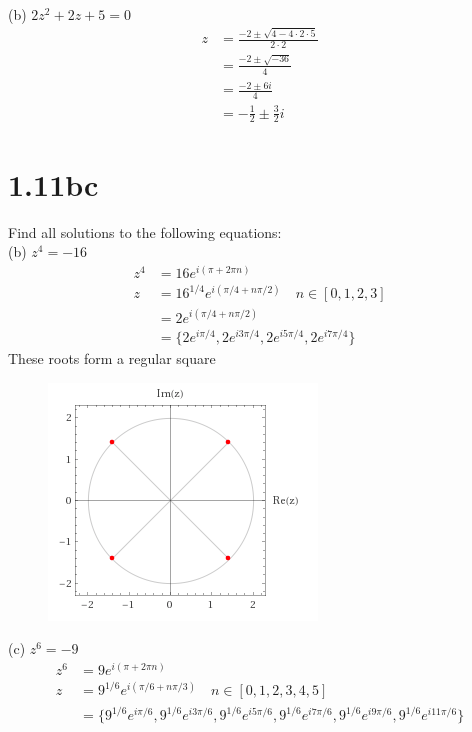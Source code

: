 \documentclass[a4paper, 11pt]{article}
\begin{document}
\noindent(b) $2z^2+2z+5=0$ 
	\begin{align*}
		z &= \frac{-2 \pm \sqrt{4-4\cdot2\cdot5}}{2\cdot2} \\ 
			&= \frac{-2 \pm \sqrt{-36}}{4} \\ 
			&=\frac{-2 \pm 6i}{4} \\ 
			&= -\frac{1}{2} \pm \frac{3}{2}i
	\end{align*}
	
\section*{1.11bc} 
Find all solutions to the following equations:\\

\noindent(b) $z^4 = -16$ \\ 
	\begin{align*}
		z^4 &= 16e^{i(\pi + 2\pi n)}\\ 
		z	&= 16^{1/4}e^{i(\pi/4+n\pi/2)} \quad n\in[0, 1, 2, 3] \\ 
			&= 2e^{i(\pi/4+n\pi/2)}\\
			&= \big\{ 2e^{i\pi/4}, 2e^{i3\pi/4}, 2e^{i5\pi/4}, 2e^{i7\pi/4} \big\}
	\end{align*}
\pagebreak
These roots form a regular square
	\begin{figure}[!hbt]
		\centering
		\includegraphics[scale=0.75]{fourthRoots}
	\end{figure}
	
\noindent(c) $z^6 = -9$ 
	\begin{align*}
		z^6 &= 9e^{i(\pi+2\pi n)} \\ 
		z	&= 9^{1/6}e^{i(\pi/6+n\pi/3)} \quad n\in[0,1,2,3,4,5] \\ 
			&= \big\{ 9^{1/6}e^{i\pi/6},9^{1/6}e^{i3\pi/6},9^{1/6}e^{i5\pi/6},9^{1/6}e^{i7\pi/6},9^{1/6}e^{i9\pi/6}, 9^{1/6}e^{i11\pi/6} \big\}
	\end{align*}
\end{document}
